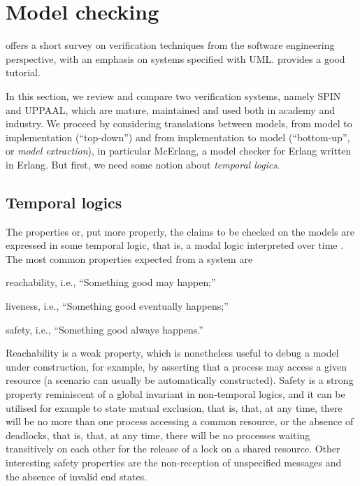 \documentclass[a4paper,11pt,twoside]{article}
\newcommand\SPIN{\textsf{SPIN}\xspace}
\newcommand\UPPAAL{\textsf{UPPAAL}\xspace}
\newcommand\McErlang{\textsf{McErlang}\xspace}
\newcommand\UML{\textsf{UML}\xspace}
\newcommand\Erlang{\textsf{Erlang}\xspace}
\begin{document}
\section{Model checking}

\citet{Kaliappan:2008} offers a short survey on verification
techniques from the software engineering perspective, with an emphasis
on systems specified with \UML. \citet{Zheng:YYYY} provides a good
tutorial.

In this section, we review and compare two verification systems,
namely \SPIN and \UPPAAL, which are mature, maintained and used both
in academy and industry. We proceed by considering translations
between models, from model to implementation (``top\hyp{}down'') and
from implementation to model (``bottom\hyp{}up'', or \emph{model
  extraction}), in particular \McErlang, a model checker for \Erlang
written in \Erlang. But first, we need some notion about
\emph{temporal logics}.

\subsection{Temporal logics}

The properties or, put more properly, the claims to be checked on the
models are expressed in some temporal logic, that is, a modal logic
interpreted over time \citep{Zheng:XXXX}. The most common properties
expected from a system are
\begin{itemize*}

  \item reachability, i.e., ``Something good may happen;''

  \item liveness, i.e., ``Something good eventually happens;''

  \item safety, i.e., ``Something good always happens.''

\end{itemize*}
Reachability is a weak property, which is nonetheless useful to debug
a model under construction, for example, by asserting that a process
may access a given resource (a scenario can usually be automatically
constructed). Safety is a strong property reminiscent of a global
invariant in non\hyp{}temporal logics, and it can be utilised for
example to state mutual exclusion, that is, that, at any time, there
will be no more than one process accessing a common resource, or the
absence of deadlocks, that is, that, at any time, there will be no
processes waiting transitively on each other for the release of a lock
on a shared resource. Other interesting safety properties are the
non\hyp{}reception of unspecified messages and the absence of invalid
end states.
\end{document}
